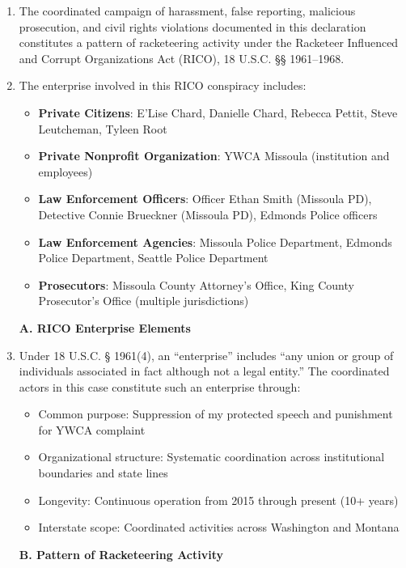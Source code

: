 \documentclass[12pt,letterpaper]{article}
\begin{document}
\begin{enumerate}

\item The coordinated campaign of harassment, false reporting, malicious prosecution, and civil rights violations documented in this declaration constitutes a pattern of racketeering activity under the Racketeer Influenced and Corrupt Organizations Act (RICO), 18 U.S.C. §§ 1961--1968.

\item The enterprise involved in this RICO conspiracy includes:

\begin{itemize}
\item \textbf{Private Citizens}: E'Lise Chard, Danielle Chard, Rebecca Pettit, Steve Leutcheman, Tyleen Root
\item \textbf{Private Nonprofit Organization}: YWCA Missoula (institution and employees)
\item \textbf{Law Enforcement Officers}: Officer Ethan Smith (Missoula PD), Detective Connie Brueckner (Missoula PD), Edmonds Police officers
\item \textbf{Law Enforcement Agencies}: Missoula Police Department, Edmonds Police Department, Seattle Police Department
\item \textbf{Prosecutors}: Missoula County Attorney's Office, King County Prosecutor's Office (multiple jurisdictions)
\end{itemize}

\textbf{A. RICO Enterprise Elements}

\item Under 18 U.S.C. § 1961(4), an ``enterprise'' includes ``any union or group of individuals associated in fact although not a legal entity.'' The coordinated actors in this case constitute such an enterprise through:

\begin{itemize}
\item Common purpose: Suppression of my protected speech and punishment for YWCA complaint
\item Organizational structure: Systematic coordination across institutional boundaries and state lines
\item Longevity: Continuous operation from 2015 through present (10+ years)
\item Interstate scope: Coordinated activities across Washington and Montana
\end{itemize}

\textbf{B. Pattern of Racketeering Activity}


\end{enumerate}
\end{document}
